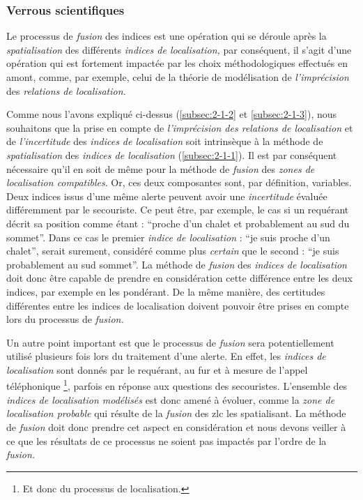 \subsubsection{Verrous scientifiques}

Le processus de \emph{fusion} des indices est une opération qui se
déroule après la \emph{spatialisation} des différents \emph{indices de
  localisation,} par conséquent, il s'agit d'une opération qui est
fortement impactée par les choix méthodologiques effectués en amont,
comme, par exemple, celui de la théorie de modélisation de
\emph{l'imprécision }des \emph{relations de localisation.}

Comme nous l'avons expliqué ci-dessus (\ref{subsec:2-1-2} et
\ref{subsec:2-1-3}), nous souhaitons que la prise en compte de
\emph{l'imprécision des relations de localisation} et de
\emph{l'incertitude} des \emph{indices de localisation} soit
intrinsèque à la méthode de \emph{spatialisation} des \emph{indices de
  localisation} (\ref{subsec:2-1-1}). Il est par conséquent nécessaire
qu'il en soit de même pour la méthode de \emph{fusion} des \emph{zones
  de localisation compatibles}.
% 
Or, ces deux composantes sont, par définition, variables. Deux indices
issus d'une même alerte peuvent avoir une \emph{incertitude} évaluée
différemment par le secouriste. Ce peut être, par exemple, le cas si
un requérant décrit sa position comme étant : \enquote{proche d'un
  chalet et probablement au sud du sommet}. Dans ce cas le premier
\emph{indice de localisation} : \enquote{je suis proche d'un chalet},
serait surement, considéré comme plus \emph{certain} que le second :
\enquote{je suis probablement au sud sommet}. La méthode de
\emph{fusion} des \emph{indices de localisation} doit donc être
capable de prendre en considération cette différence entre les deux
indices, par exemple en les pondérant. De la même manière, des
certitudes différentes entre les indices de localisation doivent
pouvoir être prises en compte lors du processus de \emph{fusion.}

Un autre point important est que le processus de \emph{fusion} sera
potentiellement utilisé plusieurs fois lors du traitement d'une
alerte. En effet, les \emph{indices de localisation} sont donnés par
le requérant, au fur et à mesure de l'appel téléphonique \footnote{Et
  donc du processus de localisation.}, parfois en réponse aux
questions des secouristes. L'ensemble des \emph{indices de
  localisation modélisés} est donc amené à évoluer, comme la
\emph{zone de localisation probable} qui résulte de la \emph{fusion}
des \ac{zlc} les spatialisant. La méthode de \emph{fusion} doit donc
prendre cet aspect en considération et nous devons veiller à ce que
les résultats de ce processus ne soient pas impactés par l'ordre de la
\emph{fusion.}

